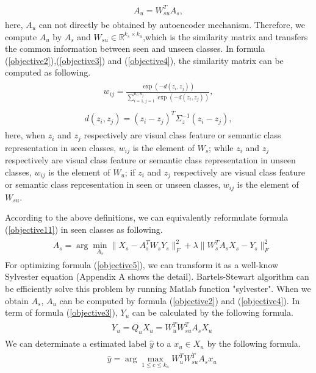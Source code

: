 \documentclass[review]{elsarticle}
\begin{document}
\begin{align}
\label{objective4}
\begin{aligned}
A_{u}=W_{su}^{T}A_{s},
  \end{aligned}
\end{align}
here, $A_{u}$ can not directly  be obtained by autoencoder mechanism. Therefore, we compute $A_{u}$ by $A_{s}$ and $W_{su}\in\mathbb{R}^{k_{s}\times k_{u}}$,which is the similarity matrix and transfers the common information between seen and unseen classes. In formula (\ref{objective2}),(\ref{objective3}) and (\ref{objective4}), the similarity matrix can be computed as following.
 \begin{align}
\label{weight}
\begin{aligned}
w_{ij}=\frac{\exp (-d(z_{i},z_{j}))}{\sum_{i=1,j=1}^{n_{i},n_{j}}\exp (-d(z_{i},z_{j}))},
 \end{aligned}
\end{align}
 \begin{align}
\label{distance}
\begin{aligned}
d(z_{i},z_{j})=(z_{i}-z_{j})^{T}\Sigma_{z}^{-1}(z_{i}-z_{j}),
 \end{aligned}
\end{align}
here, when $z_{i}$ and $z_{j}$ respectively are visual class feature or semantic class representation in seen classes, $w_{ij}$ is the element of $W_{s}$; while $z_{i}$ and $z_{j}$ respectively are visual class feature or semantic class representation in unseen classes, $w_{ij}$ is the element of $W_{u}$; if $z_{i}$ and $z_{j}$ respectively are visual class feature or semantic class representation in seen or unseen classes, $w_{ij}$ is the element of $W_{su}$.

According to the above definitions, we can equivalently reformulate formula (\ref{objective11}) in seen classes as following.
 \begin{align}
\label{objective5}
\begin{aligned}
&A_{s}=\arg \min_{A_{s}}\|X_{s}-A_{s}^{T}W_{s}Y_{s}\|^{2}_{F}+\lambda\|W_{s}^{T}A_{s}X_{s}-Y_{s}\|^{2}_{F}
 \end{aligned}
\end{align}
For optimizing formula (\ref{objective5}), we can transform it as a well-know Sylvester equation (Appendix A shows the detail). Bartels-Stewart algorithm \cite{Bartels1972Solution} can be efficiently solve this problem by running Matlab function "sylvester". When we obtain $A_{s}$, $A_{u}$ can be computed by formula (\ref{objective2}) and (\ref{objective4}).  In term of formula (\ref{objective3}), $Y_{u}$ can be calculated by the following formula.
 \begin{align}
\label{objective6}
\begin{aligned}
&Y_{u}=Q_{u}X_{u}=W_{u}^{T}W_{su}^{T}A_{s}X_{u}
 \end{aligned}
\end{align}
We can determinate a estimated label $\hat{y}$ to a $x_{u} \in X_{u}$ by the following formula.
 \begin{align}
\label{objective7}
\begin{aligned}
&\hat{y}=\arg \max_{1\leq c \leq k_{u}}W_{u}^{T}W_{su}^{T}A_{s}x_{u}
 \end{aligned}
\end{align}
\end{document}
